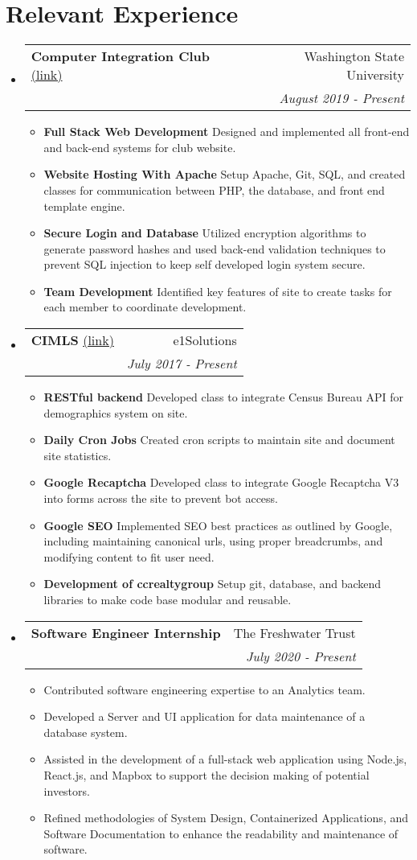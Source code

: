 \documentclass[letterpaper,11pt]{article}
\makeatletter
\newcommand{\resumeItem}[2]{
  \item\small{
    \textbf{#1}{ #2 \vspace{-2pt}}
  }
}
\newcommand{\resumeSubheading}[5]{
  \vspace{-1pt}\item
    \begin{tabular*}{0.97\textwidth}[t]{l@{\extracolsep{\fill}}r}
      \textbf{#1} #2 & #3 \\
      \textit{\small#4} & \textit{\small #5} \\
    \end{tabular*}\vspace{-5pt}
}
\newcommand{\resumeSubHeadingListStart}{\begin{itemize}[leftmargin=*]}
\newcommand{\resumeSubHeadingListEnd}{\end{itemize}}
\makeatother
\begin{document}
\section{\Large{\textbf{Relevant Experience}}}

  \resumeSubHeadingListStart
    \resumeSubheading
    {Computer Integration Club} {\href{http://www6.encs.vancouver.wsu.edu/}{(link)}}{Washington State University}
    {}{August 2019 - Present}
      \resumeSubHeadingListStart
		\resumeItem{Full Stack Web Development}{Designed and implemented all front-end and back-end systems for club website.}
        \resumeItem{Website Hosting With Apache}{Setup Apache, Git, SQL, and created classes for communication between PHP, the database, and  front end template engine.}
        \resumeItem{Secure Login and Database}{Utilized encryption algorithms to generate password hashes and used back-end validation techniques to prevent SQL injection to keep self developed login system secure.}
        \resumeItem{Team Development}{Identified key features of site to create tasks for each member to coordinate development.}
      \resumeSubHeadingListEnd
      
    \resumeSubheading
    {CIMLS} {\href{https://www.cimls.com/}{(link)}}{e1Solutions}
    {}{July 2017 - Present}
      \resumeSubHeadingListStart
   		\resumeItem{RESTful backend}{Developed class to integrate Census Bureau API for demographics system on site.}
        \resumeItem{Daily Cron Jobs}{Created cron scripts to maintain site and document site statistics.}
        \resumeItem{Google Recaptcha}{Developed class to integrate Google Recaptcha V3 into forms across the site to prevent bot access.}
        \resumeItem{Google SEO}{Implemented SEO best practices as outlined by Google, including maintaining canonical urls, using proper breadcrumbs, and modifying content to fit user need.}
        \resumeItem{Development of ccrealtygroup}{Setup git, database, and backend libraries to make code base modular and reusable.}
      \resumeSubHeadingListEnd
  
   \resumeSubheading
   {Software Engineer Internship}  {}{The Freshwater Trust}
   {}{July 2020  - Present}
      \resumeSubHeadingListStart
   		\resumeItem{}{Contributed software engineering expertise to an Analytics team.}
        \resumeItem{}{Developed a Server and UI application for data maintenance of a database system.} 
        \resumeItem{}{Assisted in the development of  a full-stack web application using Node.js, React.js, and Mapbox to support the decision making of potential investors.}
        \resumeItem{}{Refined methodologies of System Design, Containerized Applications, and Software Documentation to enhance the readability and maintenance of software.}
      \resumeSubHeadingListEnd
  \resumeSubHeadingListEnd
 
\end{document}
